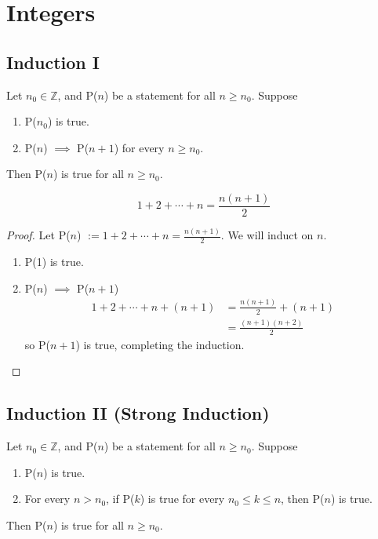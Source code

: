 \documentclass{article}
\newcommand{\Z}{\mathbb{Z}}
\newcommand{\proposition}[1]{\begin{tcolorbox}[title=Proposition]{#1}\end{tcolorbox}}
\begin{document}
\section{Integers}
\subsection{Induction I}
Let $n_0 \in \Z$, and P($n$) be a statement for all $n \geq n_0$. Suppose 
\begin{enumerate}[label=\textit{(\roman*)}]
    \item P($n_0$) is true.
    \item P($n$) $\implies$ P($n + 1$) for every $n \geq n_0$.
\end{enumerate}
Then P($n$) is true for all $n \geq n_0$.

\proposition{
    \[1 + 2 + \cdots + n = \frac{n(n + 1)}{2}\]
}
\begin{proof}
    Let P($n$) $:= 1 + 2 + \cdots + n = \frac{n(n + 1)}{2}$. We will induct on $n$.
    \begin{enumerate}[label=\textit{(\roman*)}]
        \item P(1) is true.
        \item P($n$) $\implies$ P($n + 1$)
            \newline
            \begin{align*}
                1 + 2 + \cdots + n + (n + 1) &= \frac{n(n + 1)}{2} + (n + 1) \\
                                             &= \frac{(n + 1)(n + 2)}{2}
            \end{align*}
            so P($n + 1$) is true, completing the induction.
    \end{enumerate}
\end{proof}

\subsection{Induction II (Strong Induction)}
Let $n_0 \in \Z$, and P($n$) be a statement for all $n \geq n_0$. Suppose 
\begin{enumerate}[label=\textit{(\roman*)}]
    \item P($n$) is true.
    \item For every $n > n_0$, if P($k$) is true for every $n_0 \leq k \leq n$, then P($n$) is true.
\end{enumerate}
Then P($n$) is true for all $n \geq n_0$.
\end{document}
